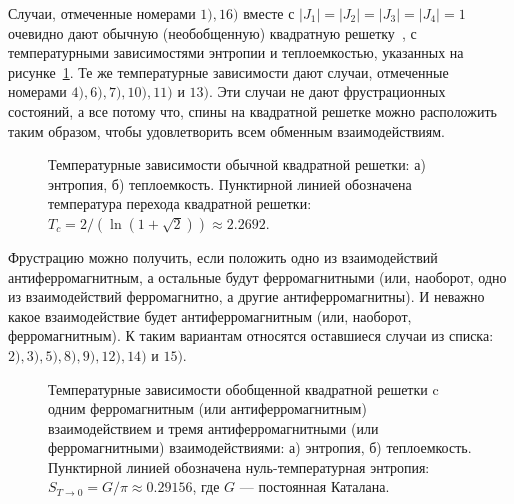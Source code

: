 Случаи, отмеченные номерами $1), 16)$ вместе с $|J_1| = |J_2| = |J_3| = |J_4| = 1$ очевидно дают обычную (необобщенную) квадратную решетку~\cite{onsager1941}, с температурными зависимостями энтропии и теплоемкостью, указанных на рисунке~\ref{SimpleSquareLattice}. Те же температурные зависимости дают случаи, отмеченные номерами $4), 6), 7), 10), 11)$ и $13)$. Эти случаи не дают фрустрационных состояний, а все потому что, спины на квадратной решетке можно расположить таким образом, чтобы удовлетворить всем обменным взаимодействиям.

\begin{figure}[h]
	\begin{minipage}[h]{0.5\linewidth}
	\end{minipage}
	\hfill
	\begin{minipage}[h]{0.5\linewidth}
	\end{minipage}
	\caption{Температурные зависимости обычной квадратной решетки: а) энтропия, б) теплоемкость. Пунктирной линией обозначена температура перехода квадратной решетки: $T_c = 2/(\ln(1+\sqrt{2}))\approx 2.2692$.}
	\label{SimpleSquareLattice}
\end{figure}

Фрустрацию можно получить, если положить одно из взаимодействий антиферромагнитным, а остальные будут ферромагнитными (или, наоборот, одно из взаимодействий ферромагнитно, а другие антиферромагнитны). И неважно какое взаимодействие будет антиферромагнитным (или, наоборот, ферромагнитным). К таким вариантам относятся оставшиеся случаи из списка: $2), 3), 5), 8), 9), 12), 14)$ и $15)$.

\begin{figure}[h]
	\begin{minipage}[h]{0.5\linewidth}
	\end{minipage}
	\hfill
	\begin{minipage}[h]{0.5\linewidth}
	\end{minipage}
	\caption{Температурные зависимости обобщенной квадратной решетки c одним ферромагнитным (или антиферромагнитным) взаимодействием и тремя антиферромагнитными (или ферромагнитными) взаимодействиями: а) энтропия, б) теплоемкость. Пунктирной линией обозначена нуль-температурная энтропия: $S_{T\rightarrow 0} = G/\pi\approx 0.29156$, где $G$ --- постоянная Каталана.}
	\label{Catalan}
\end{figure}

